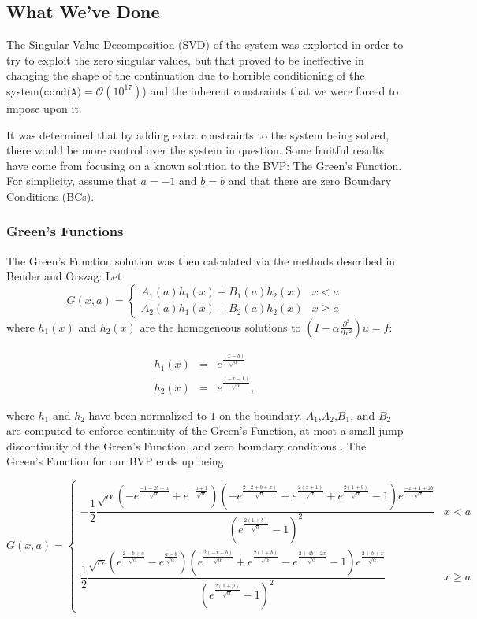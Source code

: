 \documentclass[11pt]{amsart}
\begin{document}
\subsection{What We've Done} 
The Singular Value Decomposition (SVD) of the system was explorted in order to try to exploit the zero singular values, but that proved to be ineffective in changing the shape of the continuation due to horrible conditioning of the system($\texttt{cond(A)}=\mathcal{O}(10^{17})$)  and the inherent constraints that we were forced to impose upon it. 

It was determined that by adding extra constraints to the system being solved, there would be more control over the system in question. Some fruitful results have come from focusing on a known solution to the BVP: The Green's Function. For simplicity, assume that $a=-1$ and $b=b$ and that there are zero Boundary Conditions (BCs). 

\subsubsection{Green's Functions}
The Green's Function solution was then calculated via the methods described in Bender and Orszag: Let 
\begin{equation}
G(x,a)=\begin{cases}
A_1(a)h_1(x)+B_1(a)h_2(x) & x<a \\
A_2(a)h_1(x)+B_2(a)h_2(x) & x \geq a
\end{cases}
\end{equation}
where $h_1(x)$ and $h_2(x)$ are the homogeneous solutions to  $(I-\alpha \frac{\partial^2}{\partial x^2})u=f$:

\begin{eqnarray}
h_1(x) &=& e^{\frac{(x-b)}{\sqrt{\alpha}}} \\
h_2(x) &=& e^{\frac{(-x-1)}{\sqrt{\alpha}}},
\end{eqnarray}

where $h_1$ and $h_2$ have been normalized to $1$ on the boundary.  $A_1$,$A_2$,$B_1$, and $B_2$ are computed to enforce continuity of the Green's Function, at most a small jump discontinuity of the Green's Function, and zero boundary conditions \cite{BO}.  The Green's Function for our BVP ends up being

\begin{equation}
G(x,a)=\begin{cases} 
-\dfrac{1}{2} \dfrac{\sqrt{\alpha}\left(-e^{\frac{-1-2b+a}{\sqrt{\alpha}}}+e^{-\frac{a+1}{\sqrt{\alpha}}}\right)\left(-e^{\frac{2(2+b+x)}{\sqrt{\alpha}}}+e^{\frac{2(x+1)}{\sqrt{\alpha}}}+e^{\frac{2(1+b)}{\sqrt{\alpha}}}-1\right)e^{\frac{-x+1+2b}{\sqrt{\alpha}}}}{\left(e^{\frac{2(1+b)}{\sqrt{\alpha}}}-1\right)^2} & x<a \\
\dfrac{1}{2} \dfrac{\sqrt{\alpha} \left(e^{\frac{2+b+a}{\sqrt{\alpha}}} -e^{\frac{a-b}{\sqrt{\alpha}}}\right)\left(e^{\frac{2(-x+b)}{\sqrt{\alpha}}}+e^{\frac{2(1+b)}{\sqrt{\alpha}}}-e^{\frac{2+4b-2x}{\sqrt{\alpha}}}-1\right)e^{\frac{2+b+x}{\sqrt{\alpha}}}}{\left(e^{\frac{2(1+p)}{\sqrt{\alpha}}}-1\right)^2} & x \geq a

\end{cases}
\end{equation}
\end{document}
